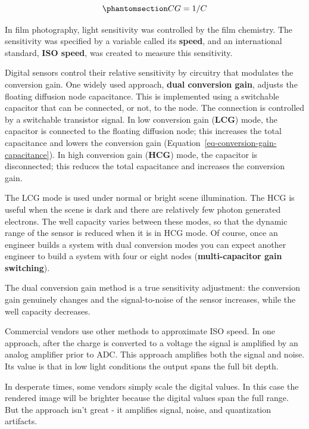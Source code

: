 \documentclass[
  letterpaper,
]{book}
\begin{document}
\begin{equation}\phantomsection\label{eq-conversion-gain-capacitance}{
CG = 1 / C
}\end{equation}

In film photography, light sensitivity was controlled by the film
chemistry. The sensitivity was specified by a variable called its
\textbf{speed}, and an international standard, \textbf{ISO speed}, was
created to measure this sensitivity.

Digital sensors control their relative sensitivity by circuitry that
modulates the conversion gain. One widely used approach, \textbf{dual
conversion gain}, adjusts the floating diffusion node capacitance. This
is implemented using a switchable capacitor that can be connected, or
not, to the node. The connection is controlled by a switchable
transistor signal. In low conversion gain (\textbf{LCG}) mode, the
capacitor is connected to the floating diffusion node; this increases
the total capacitance and lowers the conversion gain
(Equation~\ref{eq-conversion-gain-capacitance}). In high conversion gain
(\textbf{HCG}) mode, the capacitor is disconnected; this reduces the
total capacitance and increases the conversion gain.

The LCG mode is used under normal or bright scene illumination. The HCG
is useful when the scene is dark and there are relatively few photon
generated electrons. The well capacity varies between these modes, so
that the dynamic range of the sensor is reduced when it is in HCG mode.
Of course, once an engineer builds a system with dual conversion modes
you can expect another engineer to build a system with four or eight
nodes (\textbf{multi-capacitor gain switching}).

\begin{tcolorbox}[enhanced jigsaw, colframe=quarto-callout-note-color-frame, titlerule=0mm, rightrule=.15mm, opacitybacktitle=0.6, colback=white, leftrule=.75mm, coltitle=black, title=\textcolor{quarto-callout-note-color}{\faInfo}\hspace{0.5em}{Sensor speed}, bottomrule=.15mm, colbacktitle=quarto-callout-note-color!10!white, breakable, left=2mm, bottomtitle=1mm, toptitle=1mm, opacityback=0, arc=.35mm, toprule=.15mm]

The dual conversion gain method is a true sensitivity adjustment: the
conversion gain genuinely changes and the signal-to-noise of the sensor
increases, while the well capacity decreases.

Commercial vendors use other methods to approximate ISO speed. In one
approach, after the charge is converted to a voltage the signal is
amplified by an analog amplifier prior to ADC. This approach amplifies
both the signal and noise. Its value is that in low light conditions the
output spans the full bit depth.

In desperate times, some vendors simply scale the digital values. In
this case the rendered image will be brighter because the digital values
span the full range. But the approach isn't great - it amplifies signal,
noise, and quantization artifacts.

\end{tcolorbox}
\end{document}
